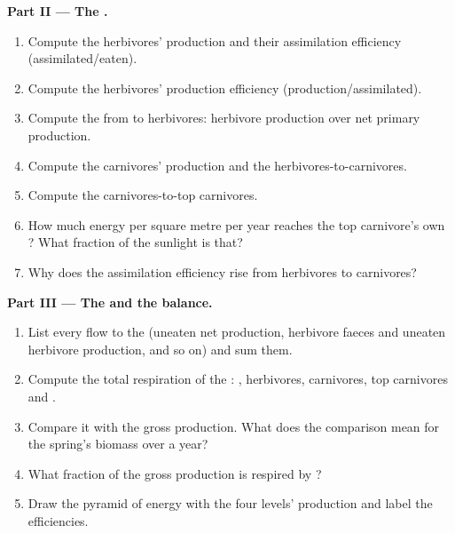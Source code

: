 \begin{problem}
\medskip
\noindent\textbf{Part II --- The .}
\begin{enumerate}[resume]
  \item Compute the herbivores' production and their assimilation
        efficiency (assimilated/eaten).
  \item Compute the herbivores' production efficiency
        (production/assimilated).
  \item Compute the  from  to herbivores:
        herbivore production over net primary production.
  \item Compute the carnivores' production and the 
        herbivores-to-carnivores.
  \item Compute the  carnivores-to-top carnivores.
  \item How much energy per square metre per year reaches the top
        carnivore's own ? What fraction of the sunlight is
        that?
  \item Why does the assimilation efficiency rise from herbivores to
        carnivores?
\end{enumerate}

\medskip
\noindent\textbf{Part III --- The  and the balance.}
\begin{enumerate}[resume]
  \item List every flow to the  (uneaten net production,
        herbivore faeces and uneaten herbivore production, and so on)
        and sum them.
  \item Compute the total respiration of the : ,
        herbivores, carnivores, top carnivores and .
  \item Compare it with the gross production. What does the comparison
        mean for the spring's biomass over a year?
  \item What fraction of the gross production is respired by
        ?
  \item Draw the pyramid of energy with the four levels' production
        and label the efficiencies.
\end{enumerate}


\end{problem}
